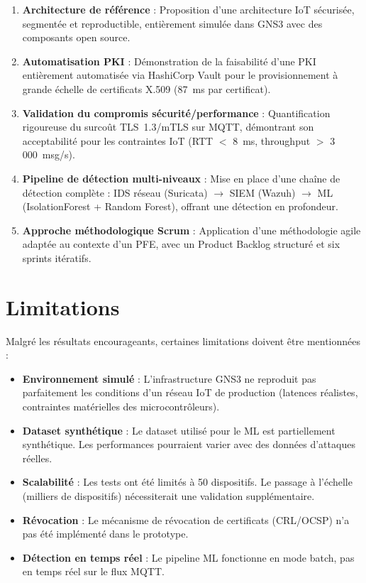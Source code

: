 \begin{enumerate}
  \item \textbf{Architecture de référence} : Proposition d'une architecture IoT sécurisée, segmentée et reproductible, entièrement simulée dans GNS3 avec des composants open source.

  \item \textbf{Automatisation PKI} : Démonstration de la faisabilité d'une PKI entièrement automatisée via HashiCorp Vault pour le provisionnement à grande échelle de certificats X.509 (87~ms par certificat).

  \item \textbf{Validation du compromis sécurité/performance} : Quantification rigoureuse du surcoût TLS~1.3/mTLS sur MQTT, démontrant son acceptabilité pour les contraintes IoT (RTT $<$ 8~ms, throughput $>$ 3\,000~msg/s).

  \item \textbf{Pipeline de détection multi-niveaux} : Mise en place d'une chaîne de détection complète : IDS réseau (Suricata) $\rightarrow$ SIEM (Wazuh) $\rightarrow$ ML (IsolationForest + Random Forest), offrant une détection en profondeur.

  \item \textbf{Approche méthodologique Scrum} : Application d'une méthodologie agile adaptée au contexte d'un PFE, avec un Product Backlog structuré et six sprints itératifs.
\end{enumerate}

\section{Limitations}

Malgré les résultats encourageants, certaines limitations doivent être mentionnées :

\begin{itemize}
  \item \textbf{Environnement simulé} : L'infrastructure GNS3 ne reproduit pas parfaitement les conditions d'un réseau IoT de production (latences réalistes, contraintes matérielles des microcontrôleurs).

  \item \textbf{Dataset synthétique} : Le dataset utilisé pour le ML est partiellement synthétique. Les performances pourraient varier avec des données d'attaques réelles.

  \item \textbf{Scalabilité} : Les tests ont été limités à 50 dispositifs. Le passage à l'échelle (milliers de dispositifs) nécessiterait une validation supplémentaire.

  \item \textbf{Révocation} : Le mécanisme de révocation de certificats (CRL/OCSP) n'a pas été implémenté dans le prototype.

  \item \textbf{Détection en temps réel} : Le pipeline ML fonctionne en mode batch, pas en temps réel sur le flux MQTT.
\end{itemize}

